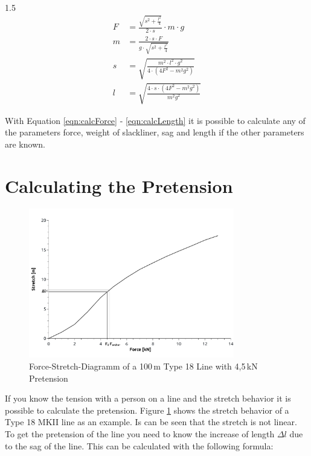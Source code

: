 \begin{spreadlines}{1.5\baselineskip}
\begin{align}
	F &= \frac{\sqrt{s^2 + \frac{l^2}{4}}}{2\cdot s} \cdot m\cdot g \label{eqn:calcForce} \\
	m &= \frac{2\cdot s\cdot F}{g\cdot\sqrt{s^2 + \frac{l^2}{4}}} \label{eqn:calcWeight} \\
	s &= \sqrt{ \frac{m^2\cdot l^2\cdot g^2}{4\cdot(4F^2 - m^2g^2)} } \label{eqn:calSag} \\
	l &= \sqrt{ \frac{4\cdot s\cdot (4F^2 - m^2g^2)}{m^2g^2} } \label{eqn:calcLength} 
\end{align}
\end{spreadlines}

With Equation \ref{eqn:calcForce} - \ref{eqn:calcLength} it is possible to calculate any of the parameters force, weight of slackliner, sag and length if the other parameters are known.

\section{Calculating the Pretension}

\begin{figure}[htb] \centering
	\includegraphics[width=0.8\textwidth]{images/forceStretchDiagram.pdf}
	\caption{Force-Stretch-Diagramm of a 100\,m Type 18 Line with 4,5\,kN Pretension}
	\label{fig:forceStretchDiagramm}
\end{figure}

If you know the tension with a person on a line and the stretch behavior it is possible to calculate the pretension. Figure \ref{fig:forceStretchDiagramm} shows the stretch behavior of a Type 18 MKII line as an example. Is can be seen that the stretch is not linear. To get the pretension of the line you need to know the increase of length $\Delta l$ due to the sag of the line. This can be calculated with the following formula:

